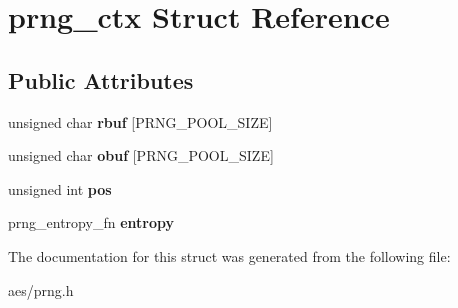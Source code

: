 \hypertarget{structprng__ctx}{}\section{prng\+\_\+ctx Struct Reference}
\label{structprng__ctx}
\subsection*{Public Attributes}
\begin{DoxyCompactItemize}
\item 
unsigned char {\bfseries rbuf} \mbox{[}P\+R\+N\+G\+\_\+\+P\+O\+O\+L\+\_\+\+S\+I\+ZE\mbox{]}\hypertarget{structprng__ctx_a452d890bef4d38b446af0425aab0fc2d}{}\label{structprng__ctx_a452d890bef4d38b446af0425aab0fc2d}

\item 
unsigned char {\bfseries obuf} \mbox{[}P\+R\+N\+G\+\_\+\+P\+O\+O\+L\+\_\+\+S\+I\+ZE\mbox{]}\hypertarget{structprng__ctx_a57834197facb91208c98103707552599}{}\label{structprng__ctx_a57834197facb91208c98103707552599}

\item 
unsigned int {\bfseries pos}\hypertarget{structprng__ctx_aaca5aa3421f9c5c04bb7199d0b176aa4}{}\label{structprng__ctx_aaca5aa3421f9c5c04bb7199d0b176aa4}

\item 
prng\+\_\+entropy\+\_\+fn {\bfseries entropy}\hypertarget{structprng__ctx_a2a59085662ed59a183fe4f1350ca0004}{}\label{structprng__ctx_a2a59085662ed59a183fe4f1350ca0004}

\end{DoxyCompactItemize}


The documentation for this struct was generated from the following file\+:\begin{DoxyCompactItemize}
\item 
aes/prng.\+h\end{DoxyCompactItemize}
